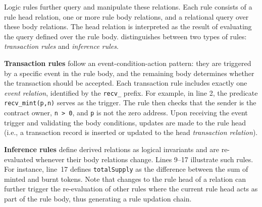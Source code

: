 Logic rules further query and manipulate these relations. Each rule consists of a rule head relation, one or more rule body relations, and a relational query over these body relations. The head relation is interpreted as the result of evaluating the query defined over the rule body.
\proto distinguishes between two types of rules: \emph{transaction rules} and \emph{inference rules}.

{\bf Transaction rules} follow an event-condition-action pattern: they are triggered by a
specific event in the rule body, and the remaining body determines whether the transaction should
be accepted. Each transaction rule includes exactly one \emph{event relation},
identified by the \lstinline{recv_} prefix. For example, in line 2, the predicate
\lstinline{recv_mint(p,n)} serves as the trigger. The rule then checks that the
sender is the contract owner, \lstinline{n > 0}, and \lstinline{p} is not the zero address.
Upon receiving the event trigger and validating the body conditions, updates are made to the rule head (i.e., a transaction record is inserted or updated to the head \emph{transaction relation}).

{\bf Inference rules} define derived relations as logical invariants and are re-evaluated whenever their body relations change. Lines 9–17 illustrate such rules. For instance,
line~17 defines \lstinline{totalSupply} as the difference between the sum of minted and burnt tokens. Note that changes to the rule head of a relation can further trigger the re-evaluation of other rules where the current rule head acts as part of the rule body, thus generating a rule updation chain.

